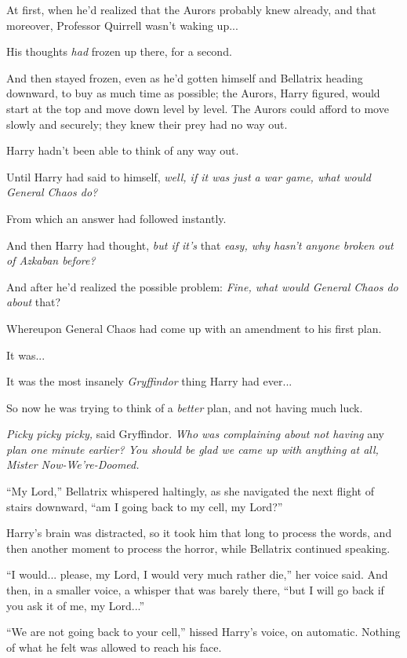 At first, when he'd realized that the Aurors probably knew already, and
that moreover, Professor Quirrell wasn't waking up...

His thoughts \emph{had} frozen up there, for a second.

And then stayed frozen, even as he'd gotten himself and Bellatrix
heading downward, to buy as much time as possible; the Aurors, Harry
figured, would start at the top and move down level by level. The Aurors
could afford to move slowly and securely; they knew their prey had no
way out.

Harry hadn't been able to think of any way out.

Until Harry had said to himself, \emph{well, if it was just a war game,
what would General Chaos do?}

From which an answer had followed instantly.

And then Harry had thought, \emph{but if it's} that \emph{easy, why
hasn't anyone broken out of Azkaban before?}

And after he'd realized the possible problem: \emph{Fine, what would
General Chaos do about} that?

Whereupon General Chaos had come up with an amendment to his first plan.

It was...

It was the most insanely \emph{Gryffindor} thing Harry had ever...

So now he was trying to think of a \emph{better} plan, and not having
much luck.

\emph{Picky picky picky,} said Gryffindor. \emph{Who was complaining
about not having} any \emph{plan one minute earlier? You should be glad
we came up with anything at all, Mister Now-We're-Doomed.}

``My Lord,'' Bellatrix whispered haltingly, as she navigated the next
flight of stairs downward, ``am I going back to my cell, my Lord?''

Harry's brain was distracted, so it took him that long to process the
words, and then another moment to process the horror, while Bellatrix
continued speaking.

``I would... please, my Lord, I would very much rather die,'' her
voice said. And then, in a smaller voice, a whisper that was barely
there, ``but I will go back if you ask it of me, my Lord...''

``We are not going back to your cell,'' hissed Harry's voice, on
automatic. Nothing of what he felt was allowed to reach his face.

